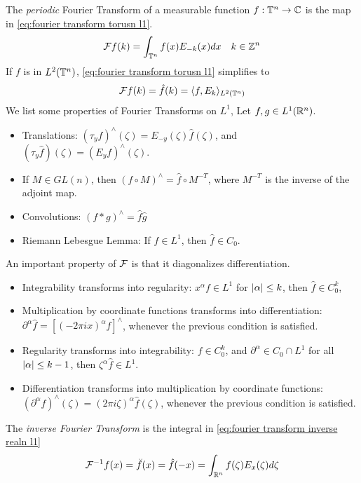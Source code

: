 \documentclass[../main-v2-manifolds.tex]{subfiles}
\begin{document}
The \emph{periodic} Fourier Transform of a measurable function $f: \mathbb{T}^n\to {\mathbb{C}}$ is the map in \cref{eq:fourier transform torusn l1}.
\begin{equation}
    \mathcal{F}{f}(k) = \int_{\mathbb{T}^n} f(x)E_{-k}(x)dx\quad k\in\mathbb{Z}^n
    \label{eq:fourier transform torusn l1}
\end{equation}
If $f$ is in $L^2(\mathbb{T}^n)$, \cref{eq:fourier transform torusn l1} simplifies to
\[
    \mathcal{F}{f}(k) = \hat{f}(k)=\langle f, E_{k}\rangle_{L^2(\mathbb{T}^n)}
\]
We list some properties of Fourier Transforms on $L^1$, Let $f,g\in L^1({\mathbb{R}^n})$.
\begin{itemize}
    \item Translations: $(\tau_y f)^\wedge(\zeta) = E_{-y}(\zeta)\hat{f}(\zeta)$, and $(\tau_{y}\hat{f})(\zeta) = (E_{y}f)^{\wedge}(\zeta)$.
    \item If $M\in GL(n)$, then $(f\circ M)^{\wedge} = \hat{f}\circ M^{-T}$, where $M^{-T}$ is the inverse of the adjoint map.
    \item Convolutions: $(f\ast g)^{\wedge} = \hat{f}\hat{g}$
    \item Riemann Lebesgue Lemma: If $f\in L^1$, then $\hat{f}\in C_0$.
\end{itemize}
An important property of $\mathcal{F}$ is that it diagonalizes differentiation.
\begin{itemize}
    \item Integrability transforms into regularity: $x^{\alpha}f\in L^1$ for $\vert {\alpha} \vert\leq k$, then $\hat{f}\in C_0^k$,
    \item Multiplication by coordinate functions transforms into differentiation: $\partial^\alpha\hat{f} = [(-2\pi i x)^{\alpha}f]^{\wedge}$, whenever the previous condition is satisfied.
    \item Regularity transforms into integrability: $f\in C_0^k$, and $\partial^\alpha\in C_0\cap L^1$ for all $\vert {\alpha} \vert\leq k-1$, then $\zeta^\alpha\hat{f}\in L^1$.
    \item Differentiation transforms into multiplication by coordinate functions: $(\partial^\alpha f)^\wedge(\zeta) = (2\pi i \zeta)^{\alpha}\hat{f}(\zeta)$, whenever the previous condition is satisfied.
\end{itemize}
The \emph{inverse Fourier Transform} is the integral in \cref{eq:fourier transform inverse realn l1}
\begin{equation}
    \mathcal{F}^{-1}{f}(x) = \breve{f}(x) = \hat{f}(-x) = \int_{{\mathbb{R}^n}}f(\zeta)E_{x}(\zeta)d\zeta
    \label{eq:fourier transform inverse realn l1}
\end{equation}
\end{document}
